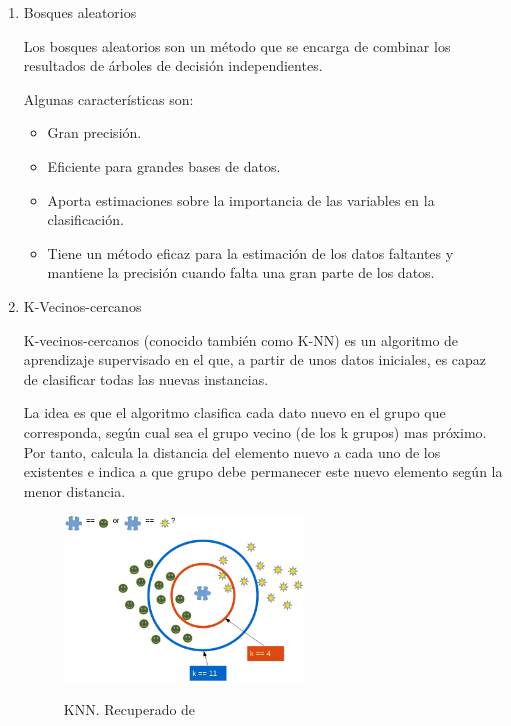 \begin{enumerate}
\item Bosques aleatorios

Los bosques aleatorios son un método que se encarga de combinar los resultados de árboles de decisión independientes.

Algunas características son:
\begin{itemize}
	\item Gran precisión.
	\item Eficiente para grandes bases de datos.
	\item Aporta estimaciones sobre la importancia de las variables en la clasificación.
	\item Tiene un método eficaz para la estimación de los datos faltantes y mantiene la precisión cuando falta una gran parte de los datos.
\end{itemize}

\item K-Vecinos-cercanos

K-vecinos-cercanos (conocido también como K-NN) es un algoritmo de aprendizaje supervisado en el que, a partir de unos datos iniciales, es capaz de clasificar todas las nuevas instancias.

La idea es que el algoritmo clasifica cada dato nuevo en el grupo que corresponda, según cual sea el grupo vecino (de los k grupos) mas próximo. Por tanto, calcula la distancia del elemento nuevo a cada uno de los existentes e indica a que grupo debe permanecer este nuevo elemento según la menor distancia.

\begin{figure}[htb]
	\centering
	\caption{KNN. Recuperado de \protect{}}
	\includegraphics[width=0.6\textwidth]{recursos/k_NN}
	\label {fig:KNN}
\end{figure}
\FloatBarrier


\end{enumerate}

